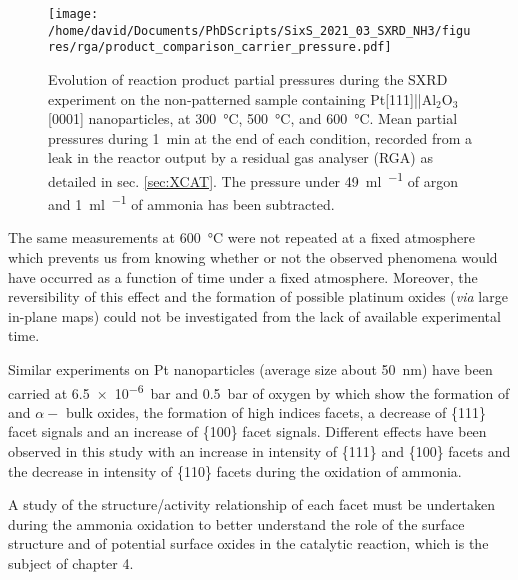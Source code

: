 \begin{figure}[!htb]
    \centering
    \texttt{[image: /home/david/Documents/PhDScripts/SixS\_2021\_03\_SXRD\_NH3/figures/rga/product\_comparison\_carrier\_pressure.pdf]}
    \caption{
        Evolution of reaction product partial pressures during the SXRD experiment on the non-patterned sample containing Pt[111]||Al$_2$O$_3$[0001] nanoparticles, at \qty{300}{\degreeCelsius}, \qty{500}{\degreeCelsius}, and \qty{600}{\degreeCelsius}.
        Mean partial pressures during \qty{1}{\minute} at the end of each condition, recorded from a leak in the reactor output by a residual gas analyser (RGA) as detailed in sec. \ref{sec:XCAT}.
        The pressure under \qty{49}{\ml\per\min} of argon and \qty{1}{\ml\per\min} of ammonia has been subtracted.
    }
    \label{fig:RGASXRDNanoparticlesComparison}
\end{figure}

The same measurements at \qty{600}{\degreeCelsius} were not repeated at a fixed atmosphere which prevents us from knowing whether or not the observed phenomena would have occurred as a function of time under a fixed atmosphere.
Moreover, the reversibility of this effect and the formation of possible platinum oxides (\textit{via} large in-plane maps) could not be investigated from the lack of available experimental time.

Similar experiments on Pt nanoparticles (average size about \qty{50}{\nm}) have been carried at \qty{6.5e-6}{\bar} and \qty{0.5}{\bar} of oxygen by \cite{Hejral2013} which show the formation of  and $\alpha-$ bulk oxides, the formation of high indices facets, a decrease of \{111\} facet signals and an increase of \{100\} facet signals.
Different effects have been observed in this study with an increase in intensity of \{111\} and \{100\} facets and the decrease in intensity of \{110\} facets during the oxidation of ammonia.

A study of the structure/activity relationship of each facet must be undertaken during the ammonia oxidation to better understand the role of the surface structure and of potential surface oxides in the catalytic reaction, which is the subject of chapter 4.
